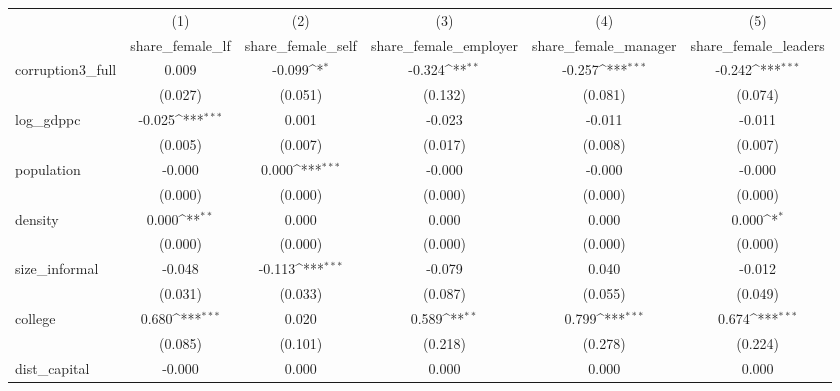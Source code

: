 {
\def\sym#1{\ifmmode^{#1}\else\(^{#1}\)\fi}
\begin{tabular}{l*{5}{c}}
\hline\hline
            &\multicolumn{1}{c}{(1)}&\multicolumn{1}{c}{(2)}&\multicolumn{1}{c}{(3)}&\multicolumn{1}{c}{(4)}&\multicolumn{1}{c}{(5)}\\
            &\multicolumn{1}{c}{share\_female\_lf}&\multicolumn{1}{c}{share\_female\_self}&\multicolumn{1}{c}{share\_female\_employer}&\multicolumn{1}{c}{share\_female\_manager}&\multicolumn{1}{c}{share\_female\_leaders}\\
\hline
corruption3\_full&       0.009         &      -0.099\sym{*}  &      -0.324\sym{**} &      -0.257\sym{***}&      -0.242\sym{***}\\
            &     (0.027)         &     (0.051)         &     (0.132)         &     (0.081)         &     (0.074)         \\
[1em]
log\_gdppc   &      -0.025\sym{***}&       0.001         &      -0.023         &      -0.011         &      -0.011         \\
            &     (0.005)         &     (0.007)         &     (0.017)         &     (0.008)         &     (0.007)         \\
[1em]
population  &      -0.000         &       0.000\sym{***}&      -0.000         &      -0.000         &      -0.000         \\
            &     (0.000)         &     (0.000)         &     (0.000)         &     (0.000)         &     (0.000)         \\
[1em]
density     &       0.000\sym{**} &       0.000         &       0.000         &       0.000         &       0.000\sym{*}  \\
            &     (0.000)         &     (0.000)         &     (0.000)         &     (0.000)         &     (0.000)         \\
[1em]
size\_informal&      -0.048         &      -0.113\sym{***}&      -0.079         &       0.040         &      -0.012         \\
            &     (0.031)         &     (0.033)         &     (0.087)         &     (0.055)         &     (0.049)         \\
[1em]
college     &       0.680\sym{***}&       0.020         &       0.589\sym{**} &       0.799\sym{***}&       0.674\sym{***}\\
            &     (0.085)         &     (0.101)         &     (0.218)         &     (0.278)         &     (0.224)         \\
[1em]
dist\_capital&      -0.000         &       0.000         &       0.000         &       0.000         &       0.000         \\

\end{tabular}}
